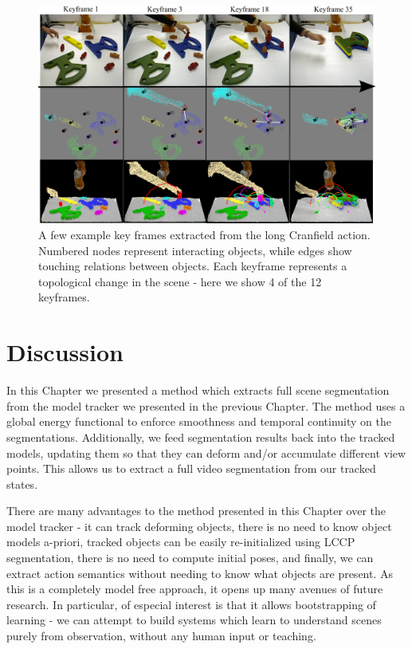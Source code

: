\begin{figure}[ht!]
  \centering
  \includegraphics[width=\linewidth]{figures/IROS2013/SECKF.pdf}
  \caption[Cranfield Key Frames]{A few example key frames extracted from the long Cranfield action. Numbered nodes represent interacting objects, while edges show touching relations between objects. Each keyframe represents a topological change in the scene - here we show 4 of the 12 keyframes.}
  \label{fig:SECGraphs}
\end{figure}

\section{Discussion}
In this Chapter we presented a method which extracts full scene segmentation from the model tracker we presented in the previous Chapter. The method uses a global energy functional to enforce smoothness and temporal continuity on the segmentations. Additionally, we feed segmentation results back into the tracked models, updating them so that they can deform and/or accumulate different view points. This allows us to extract a full video segmentation from our tracked states.

There are many advantages to the method presented in this Chapter over the model tracker - it can track deforming objects, there is no need to know object models a-priori, tracked objects can be easily re-initialized using LCCP segmentation, there is no need to compute initial poses, and finally, we can extract action semantics without needing to know what objects are present. As this is a completely model free approach, it opens up many avenues of future research. In particular, of especial interest is that it allows bootstrapping of learning - we can attempt to build systems which learn to understand scenes purely from observation, without any human input or teaching.